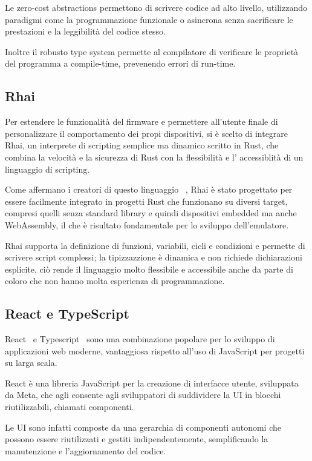 Le zero-cost abstractions permettono di scrivere codice ad alto livello, utilizzando paradigmi 
come la programmazione funzionale o asincrona senza sacrificare le prestazioni e la leggibilità del codice stesso.

Inoltre il robusto type system permette al compilatore di verificare le proprietà del programma a compile-time,
prevenendo errori di run-time.

\subsection{Rhai}

Per estendere le funzionalità del firmware e permettere all'utente finale di personalizzare il comportamento dei propi dispositivi,
si è scelto di integrare Rhai, un interprete di scripting semplice ma dinamico scritto in Rust, che combina 
la velocità e la sicurezza di Rust con la flessibilità e l' accessiblità di un linguaggio di scripting.

Come affermano i creatori di questo linguaggio~\cite{rhai_website} , Rhai è stato progettato per essere facilmente integrato in progetti Rust che 
funzionano su diversi target, compresi quelli senza standard library e quindi dispositivi embedded ma anche 
WebAssembly, il che è risultato fondamentale per lo sviluppo dell'emulatore.

Rhai supporta la definizione di funzioni, variabili, cicli e condizioni e permette di scrivere script complessi;
la tipizzazzione è dinamica e non richiede dichiarazioni esplicite, ciò rende il linguaggio molto flessibile e accessibile
anche da parte di coloro che non hanno molta esperienza di programmazione.

\subsection{React e TypeScript}

React~\cite{react_website} e Typescript~\cite{typescript_website} sono una combinazione popolare per lo sviluppo di applicazioni web moderne, vantaggiosa
rispetto all'uso di JavaScript per progetti su larga scala.

React è una libreria JavaScript per la creazione di interfacce utente, sviluppata da Meta, che agli 
consente agli sviluppatori di suddividere la UI in blocchi riutilizzabili, chiamati componenti.

Le UI sono infatti composte da una gerarchia di componenti autonomi che possono essere riutilizzati e gestiti 
indipendentemente, semplificando la manutenzione e l'aggiornamento del codice.

